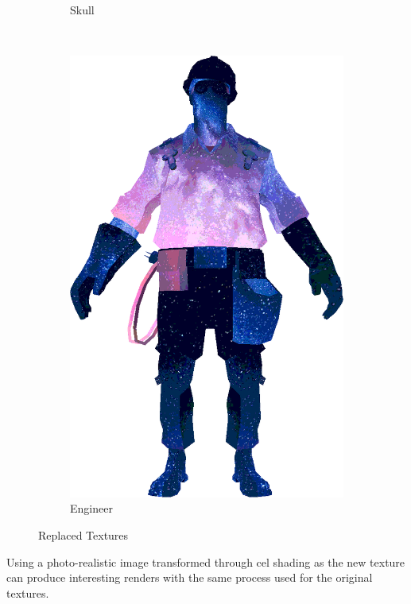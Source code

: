 \begin{figure}[h]
\begin{subfigure}[b]{0.18\textwidth}
        \caption{Skull}
        \label{fig:TextureReplacementSkull}
    \end{subfigure}
~
\hspace{24pt}
~
    \centering
    \begin{subfigure}[b]{0.15\textwidth}
        \includegraphics[width=\textwidth]{img/textures/TextureReplacement.png}
        \caption{Engineer}
        \label{fig:TextureReplacement}
    \end{subfigure}
    \caption{Replaced Textures}
    \label{fig:TexturesReplacement}
\end{figure}

Using a photo-realistic image transformed through cel shading as the new texture can produce interesting renders with the same process used for the original textures.


